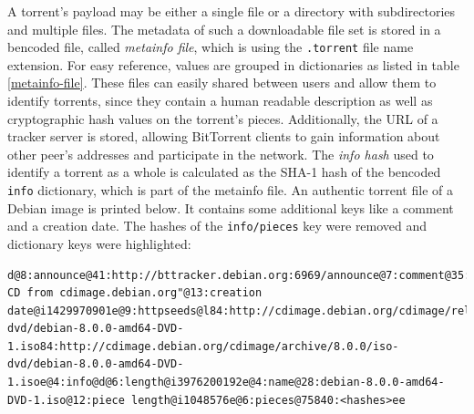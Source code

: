 \documentclass[10pt, a4paper, twoside=false, headsepline]{scrbook}
\renewcommand{\_}{\origunderscore\allowbreak}
\begin{document}
A torrent's payload may be either a single file or a directory with subdirectories and multiple files. The metadata of such a downloadable file set is stored in a bencoded file, called \emph{metainfo file}, which is using the \texttt{.torrent} file name extension. For easy reference, values are grouped in dictionaries as listed in table \ref{metainfo-file}. These files can easily shared between users and allow them to identify torrents, since they contain a human readable description as well as cryptographic hash values on the torrent's pieces. Additionally, the URL of a tracker server is stored, allowing BitTorrent clients to gain information about other peer's addresses and participate in the network. The \emph{info hash} used to identify a torrent as a whole is calculated as the SHA-1 hash of the bencoded \texttt{info} dictionary, which is part of the metainfo file. An authentic torrent file of a Debian image is printed below. It contains some additional keys like a comment and a creation date. The hashes of the \texttt{info/pieces} key were removed and dictionary keys were highlighted:
\begin{lstlisting}
d@8:announce@41:http://bttracker.debian.org:6969/announce@7:comment@35:"Debian CD from cdimage.debian.org"@13:creation date@i1429970901e@9:httpseeds@l84:http://cdimage.debian.org/cdimage/release/8.0.0/iso-dvd/debian-8.0.0-amd64-DVD-1.iso84:http://cdimage.debian.org/cdimage/archive/8.0.0/iso-dvd/debian-8.0.0-amd64-DVD-1.isoe@4:info@d@6:length@i3976200192e@4:name@28:debian-8.0.0-amd64-DVD-1.iso@12:piece length@i1048576e@6:pieces@75840:<hashes>ee
\end{lstlisting}
\end{document}
